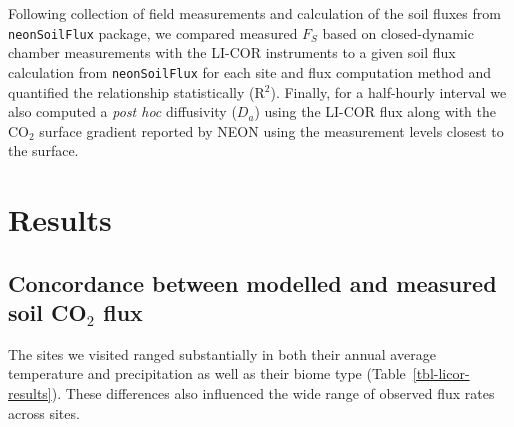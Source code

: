 \documentclass[
  letterpaper,
  DIV=11,
  numbers=noendperiod]{scrartcl}
\begin{document}
Following collection of field measurements and calculation of the soil
fluxes from \texttt{neonSoilFlux} package, we compared measured
\(F_{S}\) based on closed-dynamic chamber measurements with the LI-COR
instruments to a given soil flux calculation from \texttt{neonSoilFlux}
for each site and flux computation method and quantified the
relationship statistically (R\(^{2}\)). Finally, for a half-hourly
interval we also computed a \emph{post hoc} diffusivity (\(D_{a}\))
using the LI-COR flux along with the CO\(_{2}\) surface gradient
reported by NEON using the measurement levels closest to the surface.

\section{Results}\label{results}

\subsection{\texorpdfstring{Concordance between modelled and measured
soil CO\(_{2}\)
flux}{Concordance between modelled and measured soil CO\_\{2\} flux}}\label{concordance-between-modelled-and-measured-soil-co_2-flux}

The sites we visited ranged substantially in both their annual average
temperature and precipitation as well as their biome type
(Table~\ref{tbl-licor-results}). These differences also influenced the
wide range of observed flux rates across sites.
\end{document}
